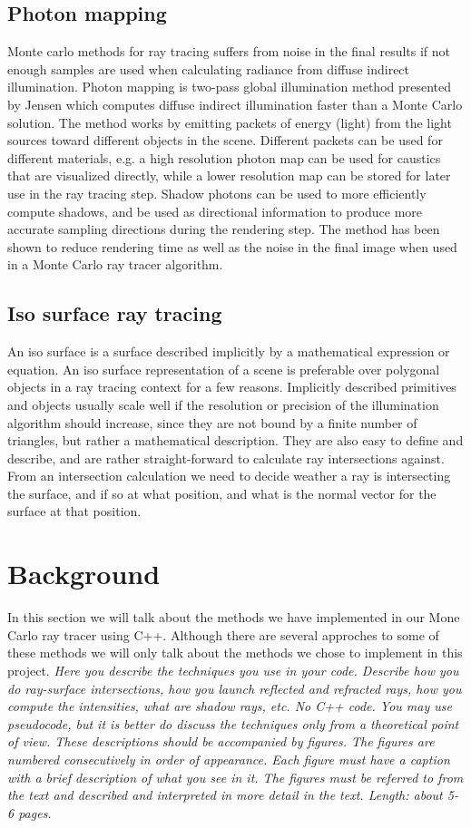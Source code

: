 \documentclass[]{report}   %
\begin{document}
\section{Photon mapping}
Monte carlo methods for ray tracing suffers from noise in the final results if not enough samples are used when calculating radiance from diffuse indirect illumination.
Photon mapping is two-pass global illumination method presented by Jensen \cite{photon_maps} which computes diffuse indirect illumination faster than a Monte Carlo solution.
The method works by emitting packets of energy (light) from the light sources toward different objects in the scene.
Different packets can be used for different materials, e.g. a high resolution photon map can be used for caustics that are visualized directly, while a lower resolution map can be stored for later use in the ray tracing step.
Shadow photons can be used to more efficiently compute shadows, and be used as directional information to produce more accurate sampling directions during the rendering step.
The method has been shown to reduce rendering time as well as the noise in the final image when used in a Monte Carlo ray tracer algorithm.
  
\section{Iso surface ray tracing}
An iso surface is a surface described implicitly by a mathematical expression or equation. An iso surface representation of a scene is preferable over polygonal objects in a ray tracing context for a few reasons. Implicitly described primitives and objects usually scale well if the resolution or precision of the illumination algorithm should increase, since they are not bound by a finite number of triangles, but rather a mathematical description. They are also easy to define and describe, and are rather straight-forward to calculate ray intersections against. From an intersection calculation we need to decide weather a ray is intersecting the surface, and if so at what position, and what is the normal vector for the surface at that position. 

\chapter{Background}
In this section we will talk about the methods we have implemented in our Mone Carlo ray tracer using C++. Although there are several approches to some of these methods we will only talk about the methods we chose to implement in this project.
\emph{Here you describe the techniques you use in your code. 
Describe how you do ray-surface intersections, how you launch reflected and refracted rays, how you compute the intensities, what are shadow rays, etc. No C++ code. 
You may use pseudocode, but it is better do discuss the techniques only from a theoretical point of view. 
These descriptions should be accompanied by figures. 
The figures are numbered consecutively in order of appearance. 
Each figure must have a caption with a brief description of what you see in it. 
The figures must be referred to from the text and described and interpreted in more detail in the text.
Length: about 5-6 pages.}
\end{document}
